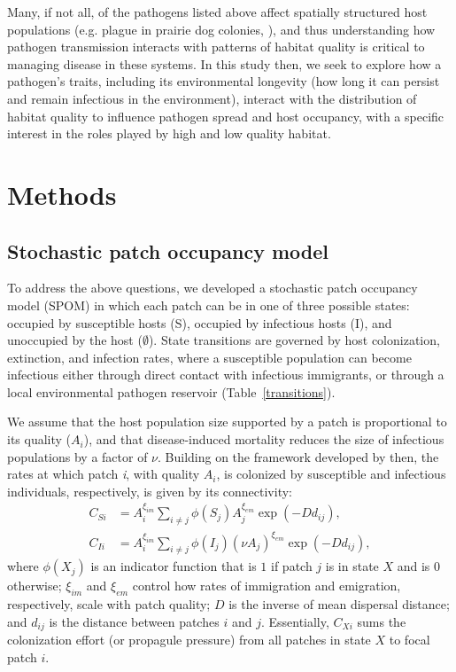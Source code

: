 \documentclass{article}
\begin{document}
Many, if not all, of the pathogens listed above affect spatially structured host populations (e.g. plague in prairie dog colonies, \cite{George2013}), and thus understanding how pathogen transmission interacts with patterns of habitat quality is critical to managing disease in these systems.  In this study then, we seek to explore how a pathogen's traits, including its environmental longevity (how long it can persist and remain infectious in the environment), interact with the distribution of habitat quality to influence pathogen spread and host occupancy, with a specific interest in the roles played by high and low quality habitat.  

\section{Methods}
\label{methods}

\subsection{Stochastic patch occupancy model}


To address the above questions, we developed a stochastic patch occupancy model (SPOM) in which each patch can be in one of three possible states: occupied by susceptible hosts (S), occupied by infectious hosts (I), and unoccupied by the host ($\emptyset$).  State transitions are governed by host colonization, extinction, and infection rates, where a susceptible population can become infectious either through direct contact with infectious immigrants, or through a local environmental pathogen reservoir (Table~\ref{transitions}).

We assume that the host population size supported by a patch is proportional to its quality ($A_i$), and that disease-induced mortality reduces the size of infectious populations by a factor of $\nu$.  Building on the framework developed by \cite{Hanski2003} then, the rates at which patch \emph{i}, with quality $A_i$, is colonized by susceptible and infectious individuals, respectively, is given by its connectivity:
\begin{align}
C_{Si} &= A_i^{\xi_{im}} \sum_{i\neq j }\phi(S_j)A_j^{\xi_{em}}\exp(-D d_{ij}),\\
C_{Ii} &= A_i^{\xi_{im}} \sum_{i\neq j }\phi(I_j)(\nu A_j) ^{\xi_{em}}\exp(-D d_{ij}),
\label{connectivity}
\end{align}
where $\phi(X_j)$ is an indicator function that is $1$ if patch $j$ is in state $X$ and is $0$ otherwise; $\xi_{im}$ and $\xi_{em}$ control how rates of immigration and emigration, respectively, scale with patch quality; $D$ is the inverse of mean dispersal distance; and $d_{ij}$ is the distance between patches $i$ and $j$.  Essentially, $C_{Xi}$ sums the colonization effort (or propagule pressure) from all patches in state $X$ to focal patch $i$.  
\end{document}
